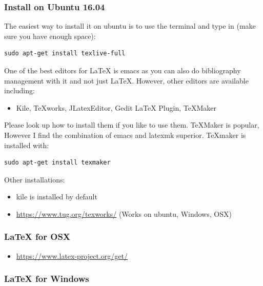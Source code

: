 \subsubsection{Install on Ubuntu 16.04}\label{install-on-ubuntu-16.04}

The easiest way to install it on ubuntu is to use the terminal and type
in (make sure you have enough space):

\begin{verbatim}
sudo apt-get install texlive-full
\end{verbatim}

One of the best editors for LaTeX is emacs as you can also do
bibliography management with it and not just LaTeX. However, other
editors are available including:

\begin{itemize}

\item
  Kile, TeXworks, JLatexEditor, Gedit LaTeX Plugin, TeXMaker
\end{itemize}

Please look up how to install them if you like to use them. TeXMaker is
popular, However I find the combination of emacs and latexmk superior.
TeXmaker is installed with:

\begin{verbatim}
sudo apt-get install texmaker
\end{verbatim}

Other installations:

\begin{itemize}

\item
  kile is installed by default
\item
  \url{https://www.tug.org/texworks/} (Works on ubuntu, Windows, OSX)
\end{itemize}

\subsubsection{LaTeX for OSX}\label{latex-for-osx}

\begin{itemize}

\item
  \url{https://www.latex-project.org/get/}
\end{itemize}

\subsubsection{LaTeX for Windows}\label{latex-for-windows}

